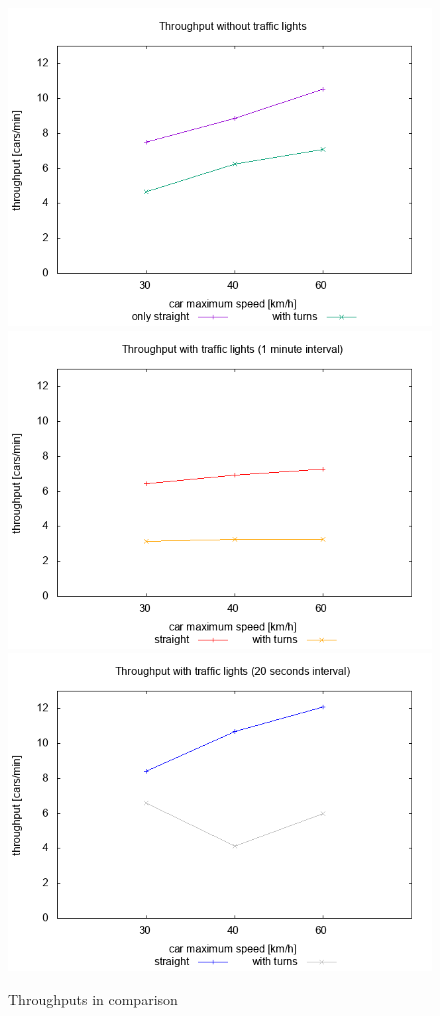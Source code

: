 \begin{figure}
\centering
\includegraphics[scale=0.5]{img/plot_throughmin_notl}
\includegraphics[scale=0.5]{img/plot_throughmin_tl}
\includegraphics[scale=0.5]{img/plot_throughmin_tl20}
\caption{Throughputs in comparison}
\label{fig:throughput}
\end{figure}
